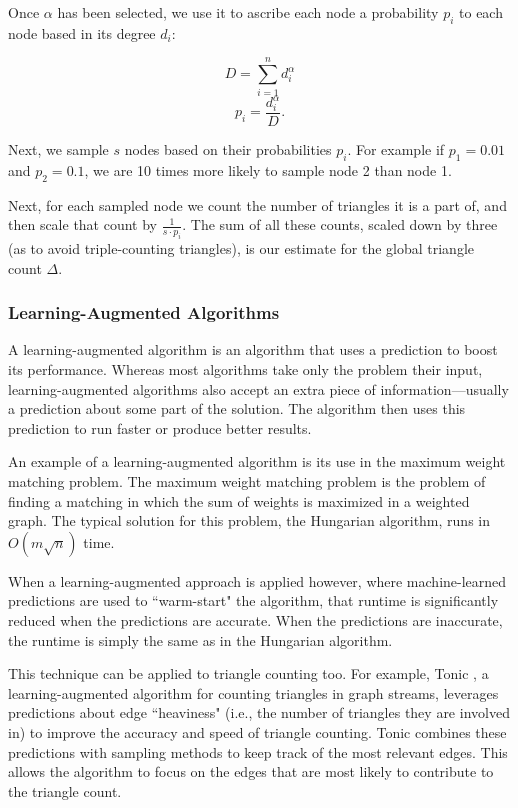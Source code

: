 \documentclass[11pt]{article}
\begin{document}
Once $\alpha$ has been selected, we use it to ascribe each node a probability $p_i$ to each node based in its degree $d_i$:

\[
D = \sum_{i = 1}^{n} d_i^\alpha
\]
\[
p_i = \frac{d_i^\alpha}{D}.
\]

Next, we sample $s$ nodes based on their probabilities $p_i$.
For example if $p_1 = 0.01$ and $p_2 = 0.1$, we are 10 times more likely to sample node 2 than node 1.

Next, for each sampled node we count the number of triangles it is a part of, and then scale that count by $\frac{1}{s \cdot p_i}$.
The sum of all these counts, scaled down by three (as to avoid triple-counting triangles), is our estimate for the global triangle count $\Delta$.

\subsubsection{Learning-Augmented Algorithms}

A learning-augmented algorithm \cite{roughgarden_algorithms_2020} is an algorithm that uses a prediction to boost its performance.
Whereas most algorithms take only the problem their input, learning-augmented algorithms also accept an extra piece of information—usually a prediction about some part of the solution.
The algorithm then uses this prediction to run faster or produce better results.

An example of a learning-augmented algorithm is its use in the maximum weight matching problem.
The maximum weight matching problem \cite{duan_linear-time_2014} is the problem of finding a matching in which the sum of weights is maximized in a weighted graph.
The typical solution for this problem, the Hungarian algorithm, runs in $O(m\sqrt{n})$ time.

When a learning-augmented approach \cite{dinitz_faster_2021} is applied however, where machine-learned predictions are used to ``warm-start" the algorithm, that runtime is significantly reduced when the predictions are accurate.
When the predictions are inaccurate, the runtime is simply the same as in the Hungarian algorithm.

This technique can be applied to triangle counting too.
For example, Tonic \cite{boldrin_fast_2024}, a learning-augmented algorithm for counting triangles in graph streams, leverages predictions about edge ``heaviness" (i.e., the number of triangles they are involved in) to improve the accuracy and speed of triangle counting.
Tonic combines these predictions with sampling methods to keep track of the most relevant edges.
This allows the algorithm to focus on the edges that are most likely to contribute to the triangle count.
\end{document}
